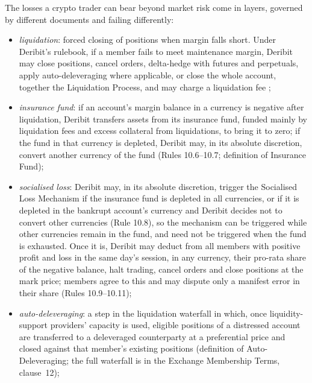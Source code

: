 \begin{qfdefinition}\label{def:crypto-trading-risk-layers}
 The losses a crypto trader can bear beyond market risk come in layers, governed by different documents and failing differently:
\begin{itemize}
\item \emph{liquidation}: forced closing of positions when margin falls short. Under Deribit's rulebook, if a member fails to meet maintenance margin, Deribit may close positions, cancel orders, delta-hedge with futures and perpetuals, apply auto-deleveraging where applicable, or close the whole account, together the Liquidation Process, and may charge a liquidation fee \citep[Rulebook v2.0, Rules 10.1 and~10.5]{gapclose-deribit-rules};
\item \emph{insurance fund}: if an account's margin balance in a currency is negative after liquidation, Deribit transfers assets from its insurance fund, funded mainly by liquidation fees and excess collateral from liquidations, to bring it to zero; if the fund in that currency is depleted, Deribit may, in its absolute discretion, convert another currency of the fund (Rules 10.6--10.7; definition of Insurance Fund);
\item \emph{socialised loss}: Deribit may, in its absolute discretion, trigger the Socialised Loss Mechanism if the insurance fund is depleted in all currencies, or if it is depleted in the bankrupt account's currency and Deribit decides not to convert other currencies (Rule 10.8), so the mechanism can be triggered while other currencies remain in the fund, and need not be triggered when the fund is exhausted. Once it is, Deribit may deduct from all members with positive profit and loss in the same day's session, in any currency, their pro-rata share of the negative balance, halt trading, cancel orders and close positions at the mark price; members agree to this and may dispute only a manifest error in their share (Rules 10.9--10.11);
\item \emph{auto-deleveraging}: a step in the liquidation waterfall in which, once liquidity-support providers' capacity is used, eligible positions of a distressed account are transferred to a deleveraged counterparty at a preferential price and closed against that member's existing positions (definition of Auto-Deleveraging; the full waterfall is in the Exchange Membership Terms, clause~12);

\end{itemize}
\end{qfdefinition}
